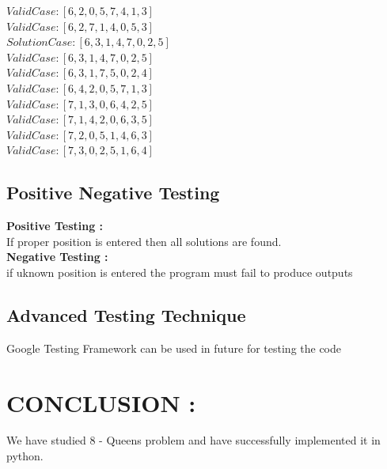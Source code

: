 \documentclass[10pt,a4paper]{article}
\begin{document}
				$Valid Case   : [6, 2, 0, 5, 7, 4, 1, 3]$\\
				$Valid Case   : [6, 2, 7, 1, 4, 0, 5, 3]$\\
				$Solution Case: [6, 3, 1, 4, 7, 0, 2, 5]$\\
				$Valid Case   : [6, 3, 1, 4, 7, 0, 2, 5]$\\
				$Valid Case   : [6, 3, 1, 7, 5, 0, 2, 4]$\\
				$Valid Case   : [6, 4, 2, 0, 5, 7, 1, 3]$\\
				$Valid Case   : [7, 1, 3, 0, 6, 4, 2, 5]$\\
				$Valid Case   : [7, 1, 4, 2, 0, 6, 3, 5]$\\
				$Valid Case   : [7, 2, 0, 5, 1, 4, 6, 3]$\\
				$Valid Case   : [7, 3, 0, 2, 5, 1, 6, 4]$\\
				
				\subsection{Positive Negative Testing}
				
				\textbf{Positive Testing :}\\
				If proper position is entered then all solutions are found.\\
				\textbf{ Negative Testing :}\\
				if uknown position is entered the program must fail to produce outputs
				
				
				\subsection{Advanced Testing Technique}
				Google Testing Framework can be used in future for testing the code

			
\section{CONCLUSION : }
	We have studied 8 - Queens problem  and have successfully implemented it in python.
\end{document}
